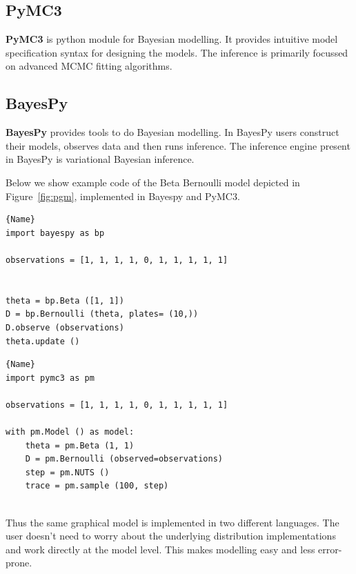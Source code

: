 \subsection{PyMC3}

\textbf{PyMC3} is python module for Bayesian modelling. It provides intuitive model specification syntax for designing the models. The inference is primarily focussed on advanced MCMC fitting algorithms.


\subsection{BayesPy}

\textbf{BayesPy} provides tools to do Bayesian modelling. In BayesPy users construct their models, observes data and then runs inference. The inference engine present in BayesPy is variational Bayesian inference.

Below we show example code of the Beta Bernoulli model depicted in Figure~\ref{fig:pgm}, implemented in Bayespy and PyMC3.

\noindent\begin{minipage}{.46\textwidth}
\begin{lstlisting}[caption=BayesPy Code,frame=tlrb]{Name}
import bayespy as bp

observations = [1, 1, 1, 1, 0, 1, 1, 1, 1, 1]


theta = bp.Beta ([1, 1])
D = bp.Bernoulli (theta, plates= (10,))
D.observe (observations)
theta.update ()

\end{lstlisting}
\end{minipage}\hfill
\begin{minipage}{.46\textwidth}
\begin{lstlisting}[caption=PyMC3 code,frame=tlrb]{Name}
import pymc3 as pm

observations = [1, 1, 1, 1, 0, 1, 1, 1, 1, 1]

with pm.Model () as model:
    theta = pm.Beta (1, 1)
    D = pm.Bernoulli (observed=observations)
    step = pm.NUTS () 
    trace = pm.sample (100, step)
    
\end{lstlisting}

\end{minipage}


Thus the same graphical model is implemented in two different languages. The user doesn't need to worry about the underlying distribution implementations and work directly at the model level. This makes modelling easy and less error-prone. 


